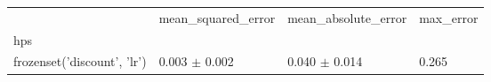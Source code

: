 \begin{tabular}{llll}
\toprule
 & mean_squared_error & mean_absolute_error & max_error \\
hps &  &  &  \\
\midrule
frozenset({'discount', 'lr'}) & 0.003 $\pm$ 0.002 & 0.040 $\pm$ 0.014 & 0.265 \\
\bottomrule
\end{tabular}
